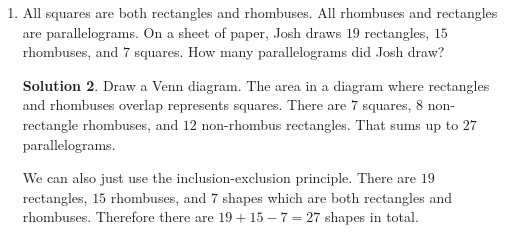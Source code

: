 \documentclass{article}
\theoremstyle{definition}
\newtheorem*{solution}{Solution}
\begin{document}
\begin{enumerate}
\begin{solution}
            in his set that are greater than $8$ or $9$. The probability, then, 
            that Jerry's randomly selected number is greater than the sum of 
            Tom's three randomly selected numbers is $\frac{1}{2} \cdot 
            \frac{1}{2} + \frac{1}{2} \cdot \frac{1}{3} = \frac{1}{4} + 
            \frac{1}{6} = \frac{6}{24} + \frac{4}{24} = \frac{10}{24} = 
            \frac{5}{12}$.
        \end{solution}
    \item All squares are both rectangles and rhombuses. All rhombuses and 
        rectangles are parallelograms. On a sheet of paper, Josh draws $19$ 
        rectangles, $15$ rhombuses, and $7$ squares. How many parallelograms did 
        Josh draw?
        \begin{solution}
            Draw a Venn diagram. The area in a diagram where rectangles and 
            rhombuses overlap represents squares. There are $7$ squares, $8$ 
            non-rectangle rhombuses, and $12$ non-rhombus rectangles. That sums 
            up to $27$ parallelograms.

            We can also just use the inclusion-exclusion principle. There are 
            $19$ rectangles, $15$ rhombuses, and $7$ shapes which are both 
            rectangles and rhombuses. Therefore there are $19 + 15 - 7 = 27$ 
            shapes in total.
        \end{solution}
\end{enumerate}
\end{document}
